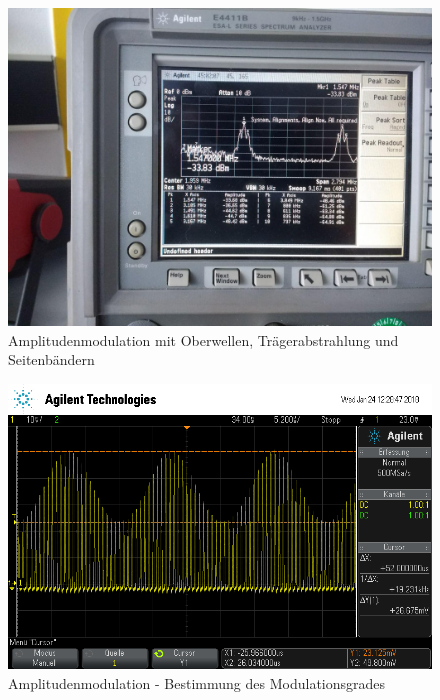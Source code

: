 \begin{figure}
	\centering
	\includegraphics[width=\textwidth]{img/Aufgabenteil_c1.jpg}
	\caption{Amplitudenmodulation mit Oberwellen, Trägerabstrahlung und Seitenbändern}
	\label{c1}
\end{figure}

\begin{figure}
	\centering
	\includegraphics[width=\textwidth]{img/c_scope_247.png}
	\caption{Amplitudenmodulation - Bestimmung des Modulationsgrades}
	\label{c2}
\end{figure}

